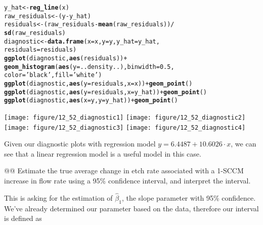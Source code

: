 \documentclass[10pt]{article}\usepackage[]{graphicx}\usepackage[]{xcolor}
\makeatletter
\newcommand{\hlnum}[1]{\textcolor[rgb]{0.686,0.059,0.569}{#1} }%
\newcommand{\hlstr}[1]{\textcolor[rgb]{0.192,0.494,0.8}{#1} }%
\newcommand{\hlopt}[1]{\textcolor[rgb]{0,0,0}{#1} }%
\newcommand{\hlstd}[1]{\textcolor[rgb]{0.345,0.345,0.345}{#1} }%
\newcommand{\hlkwb}[1]{\textcolor[rgb]{0.69,0.353,0.396}{#1} }%
\newcommand{\hlkwc}[1]{\textcolor[rgb]{0.333,0.667,0.333}{#1} }%
\newcommand{\hlkwd}[1]{\textcolor[rgb]{0.737,0.353,0.396}{\textbf{#1} } }%
\newenvironment{kframe}{%
 \def\at@end@of@kframe{}%
 \ifinner\ifhmode%
  \def\at@end@of@kframe{\end{minipage} }%
  \begin{minipage}{\columnwidth}%
 \fi\fi%
 \def\FrameCommand##1{\hskip\@totalleftmargin \hskip-\fboxsep
 \colorbox{shadecolor}{##1}\hskip-\fboxsep
     \hskip-\linewidth \hskip-\@totalleftmargin \hskip\columnwidth}%
 \MakeFramed {\advance\hsize-\width
   \@totalleftmargin\z@ \linewidth\hsize
   \@setminipage} }%
 {\par\unskip\endMakeFramed%
 \at@end@of@kframe}
\newenvironment{knitrout}{}{} %
\makeatother
\begin{document}
\begin{easylist}[enumerate]
\begin{knitrout}
\begin{kframe}
\begin{alltt}
         \hlstd{y_hat} \hlkwb{<-} \hlkwd{reg_line}\hlstd{(x)}
         \hlstd{raw_residuals} \hlkwb{<-} \hlstd{(y} \hlopt{-} \hlstd{y_hat)}
         \hlstd{residuals} \hlkwb{<-} \hlstd{(raw_residuals} \hlopt{-} \hlkwd{mean}\hlstd{(raw_residuals))} \hlopt{/}
                         \hlkwd{sd}\hlstd{(raw_residuals)}
         \hlstd{diagnostic} \hlkwb{<-} \hlkwd{data.frame}\hlstd{(}\hlkwc{x}\hlstd{=x,} \hlkwc{y}\hlstd{=y,} \hlkwc{y_hat}\hlstd{=y_hat,}
                                  \hlkwc{residuals}\hlstd{=residuals)}
         \hlkwd{ggplot}\hlstd{(diagnostic,} \hlkwd{aes}\hlstd{(residuals))} \hlopt{+}
             \hlkwd{geom_histogram}\hlstd{(}\hlkwd{aes}\hlstd{(}\hlkwc{y}\hlstd{=..density..),} \hlkwc{binwidth}\hlstd{=}\hlnum{0.5}\hlstd{,}
                            \hlkwc{color}\hlstd{=}\hlstr{'black'}\hlstd{,} \hlkwc{fill}\hlstd{=}\hlstr{'white'}\hlstd{)}
         \hlkwd{ggplot}\hlstd{(diagnostic,} \hlkwd{aes}\hlstd{(}\hlkwc{y}\hlstd{=residuals,} \hlkwc{x}\hlstd{=x))} \hlopt{+} \hlkwd{geom_point}\hlstd{()}
         \hlkwd{ggplot}\hlstd{(diagnostic,} \hlkwd{aes}\hlstd{(}\hlkwc{y}\hlstd{=residuals,} \hlkwc{x}\hlstd{=y_hat))} \hlopt{+} \hlkwd{geom_point}\hlstd{()}
         \hlkwd{ggplot}\hlstd{(diagnostic,} \hlkwd{aes}\hlstd{(}\hlkwc{x}\hlstd{=y,} \hlkwc{y}\hlstd{=y_hat))} \hlopt{+} \hlkwd{geom_point}\hlstd{()}
\end{alltt}
\end{kframe}

{\centering \texttt{[image: figure/12\_52\_diagnostic1]} 
\texttt{[image: figure/12\_52\_diagnostic2]} 
\texttt{[image: figure/12\_52\_diagnostic3]} 
\texttt{[image: figure/12\_52\_diagnostic4]} 

}



\end{knitrout}


    Given our diagnostic plots with regression model $y=6.4487 + 10.6026 \cdot x$, we can see that a linear
    regression model is a useful model in this case.

    @@ Estimate the true average change in etch rate associated with a 1-SCCM increase in flow rate using a 95\%
    confidence interval, and interpret the interval.\newline

    This is asking for the estimation of $\hat{\beta}_1$, the slope parameter with 95\% confidence. We've already
    determined our parameter based on the data, therefore our interval is defined as


\end{easylist}
\end{document}
